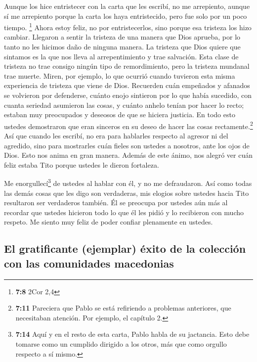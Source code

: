  Aunque los hice entristecer con la carta que les escribí,
no me arrepiento, aunque sí me arrepiento porque la carta los haya
entristecido, pero fue solo por un poco tiempo. \footnote{\textbf{7:8}
  2Cor 2,4}  Ahora estoy feliz, no por entristecerlos,
sino porque esa tristeza los hizo cambiar. Llegaron a sentir la tristeza
de una manera que Dios aprueba, por lo tanto no les hicimos daño de
ninguna manera.  La tristeza que Dios quiere que sintamos
es la que nos lleva al arrepentimiento y trae salvación. Esta clase de
tristeza no trae consigo ningún tipo de remordimiento, pero la tristeza
mundanal trae muerte.  Miren, por ejemplo, lo que ocurrió
cuando tuvieron esta misma experiencia de tristeza que viene de Dios.
Recuerden cuán empeñados y afanados se volvieron por defenderse, cuánto
enojo sintieron por lo que había sucedido, con cuanta seriedad asumieron
las cosas, y cuánto anhelo tenían por hacer lo recto; estaban muy
preocupados y deseosos de que se hiciera justicia. En todo esto ustedes
demostraron que eran sinceros en su deseo de hacer las cosas
rectamente.\footnote{\textbf{7:11} Pareciera que Pablo se está
  refiriendo a problemas anteriores, que necesitaban atención. Por
  ejemplo, el capítulo 2.}  Así que cuando les escribí,
no era para hablarles respecto al agresor ni del agredido, sino para
mostrarles cuán fieles son ustedes a nosotros, ante los ojos de Dios.
 Esto nos anima en gran manera. Además de este ánimo, nos
alegró ver cuán feliz estaba Tito porque ustedes le dieron fortaleza.

 Me enorgullecí\footnote{\textbf{7:14} Aquí y en el resto
  de esta carta, Pablo habla de su jactancia. Esto debe tomarse como un
  cumplido dirigido a los otros, más que como orgullo respecto a sí
  mismo.} de ustedes al hablar con él, y no me defraudaron. Así como
todas las demás cosas que les digo son verdaderas, mis elogios sobre
ustedes hacia Tito resultaron ser verdaderos también.  Él
se preocupa por ustedes aún más al recordar que ustedes hicieron todo lo
que él les pidió y lo recibieron con mucho respeto.  Me
siento muy feliz de poder confiar plenamente en ustedes.

\hypertarget{el-gratificante-ejemplar-uxe9xito-de-la-colecciuxf3n-con-las-comunidades-macedonias}{%
\subsection{El gratificante (ejemplar) éxito de la colección con las
comunidades
macedonias}\label{el-gratificante-ejemplar-uxe9xito-de-la-colecciuxf3n-con-las-comunidades-macedonias}}

